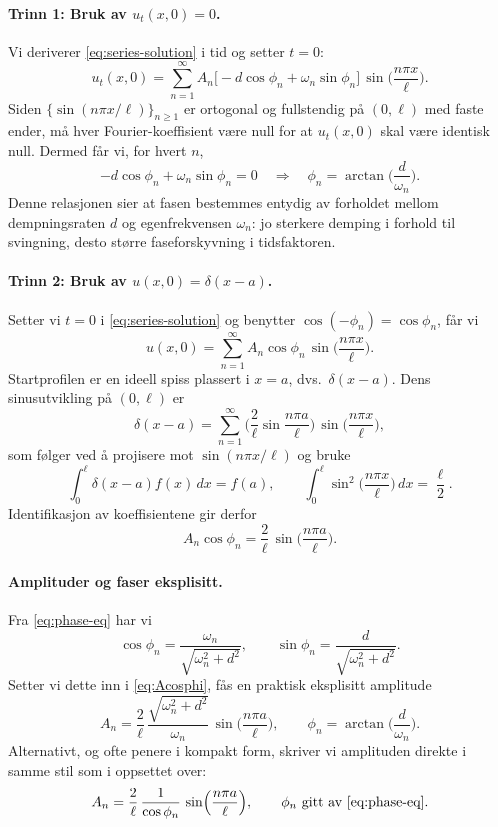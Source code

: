 \paragraph{Trinn 1: Bruk av $u_t(x,0)=0$.}
Vi deriverer \eqref{eq:series-solution} i tid og setter $t=0$:
\[
u_t(x,0)=\sum_{n=1}^{\infty} A_n\Big[-d\cos\phi_n+\omega_n\sin\phi_n\Big]\,
\sin\!\Big(\frac{n\pi x}{\ell}\Big).
\]
Siden \(\{\sin(n\pi x/\ell)\}_{n\ge 1}\) er ortogonal og fullstendig på \((0,\ell)\) med faste ender, må hver Fourier-koeffisient være null for at $u_t(x,0)$ skal være identisk null. Dermed får vi, for hvert $n$,
\begin{equation}\label{eq:phase-eq}
-d\cos\phi_n+\omega_n\sin\phi_n=0
\quad\Longrightarrow\quad
\phi_n=\arctan\!\Big(\frac{d}{\omega_n}\Big).
\end{equation}
Denne relasjonen sier at fasen bestemmes entydig av forholdet mellom dempningsraten \(d\) og egenfrekvensen \(\omega_n\): jo sterkere demping i forhold til svingning, desto større faseforskyvning i tidsfaktoren.

\paragraph{Trinn 2: Bruk av $u(x,0)=\delta(x-a)$.}
Setter vi $t=0$ i \eqref{eq:series-solution} og benytter \(\cos(-\phi_n)=\cos\phi_n\), får vi
\[
u(x,0)=\sum_{n=1}^{\infty} A_n\cos\phi_n\,\sin\!\Big(\frac{n\pi x}{\ell}\Big).
\]
Startprofilen er en ideell spiss plassert i \(x=a\), dvs.\ \(\delta(x-a)\). Dens sinusutvikling på \((0,\ell)\) er
\[
\delta(x-a)=\sum_{n=1}^{\infty}\Big(\frac{2}{\ell}\sin\!\frac{n\pi a}{\ell}\Big)\,
\sin\!\Big(\frac{n\pi x}{\ell}\Big),
\]
som følger ved å projisere mot \(\sin(n\pi x/\ell)\) og bruke
\[
\int_0^\ell \delta(x-a)f(x)\,dx=f(a),\qquad
\int_0^\ell \sin^2\!\Big(\frac{n\pi x}{\ell}\Big)\,dx=\frac{\ell}{2}.
\]
Identifikasjon av koeffisientene gir derfor
\begin{equation}\label{eq:Acosphi}
A_n\cos\phi_n=\frac{2}{\ell}\,\sin\!\Big(\frac{n\pi a}{\ell}\Big).
\end{equation}

\paragraph{Amplituder og faser eksplisitt.}
Fra \eqref{eq:phase-eq} har vi
\[
\cos\phi_n=\frac{\omega_n}{\sqrt{\omega_n^2+d^2}},\qquad
\sin\phi_n=\frac{d}{\sqrt{\omega_n^2+d^2}}.
\]
Setter vi dette inn i \eqref{eq:Acosphi}, fås en praktisk eksplisitt amplitude
\begin{equation}\label{eq:An-explicit}
A_n=\frac{2}{\ell}\,\frac{\sqrt{\omega_n^2+d^2}}{\omega_n}\,
\sin\!\Big(\frac{n\pi a}{\ell}\Big),
\qquad
\phi_n=\arctan\!\Big(\frac{d}{\omega_n}\Big).
\end{equation}
Alternativt, og ofte penere i kompakt form, skriver vi amplituden direkte i samme stil som i oppsettet over:
\begin{equation}\label{eq:An-cosphi}
A_n=\frac{2}{\ell}\,\frac{1}{\cos\phi_n}\,
\sin\!\Big(\frac{n\pi a}{\ell}\Big),
\qquad
\phi_n \text{ gitt av \eqref{eq:phase-eq}.}
\end{equation}


